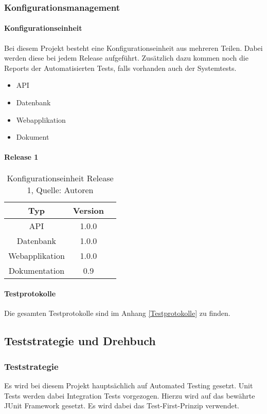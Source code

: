 \subsubsection{Konfigurationsmanagement}
\paragraph{Konfigurationseinheit}

Bei diesem Projekt besteht eine Konfigurationseinheit aus mehreren Teilen. Dabei werden diese bei jedem Release aufgeführt. Zusätzlich dazu kommen noch die Reports der Automatisierten Tests, falls vorhanden auch der Systemtests.
\begin{itemize}
\item API
\item Datenbank
\item Webapplikation
\item Dokument
\end{itemize}
\paragraph{Release 1}

\begin{table}[H]
\setlength\extrarowheight{2pt} %
\begin{tabularx}{\textwidth}{|C|C|C|}
\hline
\textbf{Typ} &  \textbf{Version}  \\

\hline
API &  1.0.0\\
\hline
Datenbank &  1.0.0\\
\hline
Webapplikation  & 1.0.0\\
\hline
Dokumentation & 0.9\\
\hline
\end{tabularx}
\caption{ \label{tbl: Konfigurationseinheit Release 1}Konfigurationseinheit Release 1, Quelle: Autoren}
\end{table}

\paragraph{Testprotokolle}
Die gesamten Testprotokolle sind im Anhang \ref{Testprotokolle} zu finden. 
\newpage
\subsection{Teststrategie und Drehbuch}
\subsubsection{Teststrategie}
Es wird bei diesem Projekt hauptsächlich auf Automated Testing gesetzt.
Unit Tests werden dabei Integration Tests vorgezogen.
Hierzu wird auf das bewährte JUnit Framework gesetzt.
Es wird dabei das Test-First-Prinzip verwendet.


